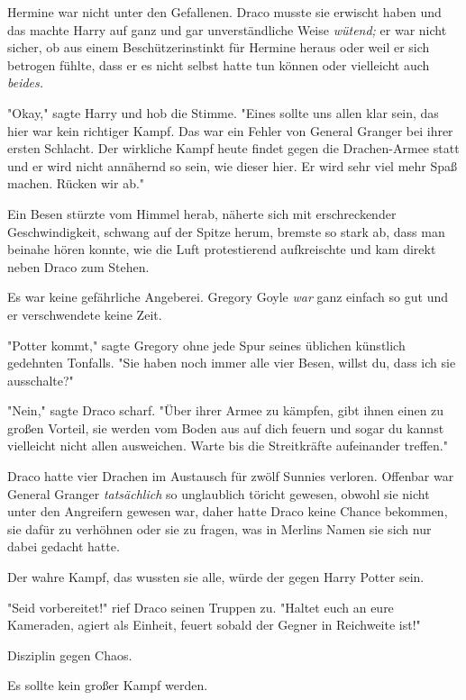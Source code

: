 {Hermine war nicht unter den Gefallenen. Draco musste sie erwischt haben und das machte Harry auf ganz und gar unverständliche Weise \emph{wütend;} er war nicht sicher, ob aus einem Beschützerinstinkt für Hermine heraus oder weil er sich betrogen fühlte, dass er es nicht selbst hatte tun können oder vielleicht auch \emph{beides.}

"Okay," sagte Harry und hob die Stimme. "Eines sollte uns allen klar sein, das hier war kein richtiger Kampf. Das war ein Fehler von General Granger bei ihrer ersten Schlacht. Der wirkliche Kampf heute findet gegen die Drachen-Armee statt und er wird nicht annähernd so sein, wie dieser hier. Er wird sehr viel mehr Spaß machen. Rücken wir ab."

\later

Ein Besen stürzte vom Himmel herab, näherte sich mit erschreckender Geschwindigkeit, schwang auf der Spitze herum, bremste so stark ab, dass man beinahe hören konnte, wie die Luft protestierend aufkreischte und kam direkt neben Draco zum Stehen.

Es war keine gefährliche Angeberei. Gregory Goyle \emph{war} ganz einfach so gut und er verschwendete keine Zeit.

"Potter kommt," sagte Gregory ohne jede Spur seines üblichen künstlich gedehnten Tonfalls. "Sie haben noch immer alle vier Besen, willst du, dass ich sie ausschalte?"

"Nein," sagte Draco scharf. "Über ihrer Armee zu kämpfen, gibt ihnen einen zu großen Vorteil, sie werden vom Boden aus auf dich feuern und sogar du kannst vielleicht nicht allen ausweichen. Warte bis die Streitkräfte aufeinander treffen."

Draco hatte vier Drachen im Austausch für zwölf Sunnies verloren. Offenbar war General Granger \emph{tatsächlich} so unglaublich töricht gewesen, obwohl sie nicht unter den Angreifern gewesen war, daher hatte Draco keine Chance bekommen, sie dafür zu verhöhnen oder sie zu fragen, was in Merlins Namen sie sich nur dabei gedacht hatte.

Der wahre Kampf, das wussten sie alle, würde der gegen Harry Potter sein.

"Seid vorbereitet!" rief Draco seinen Truppen zu. "Haltet euch an eure Kameraden, agiert als Einheit, feuert sobald der Gegner in Reichweite ist!"

Disziplin gegen Chaos.

Es sollte kein großer Kampf werden.

\later

}
